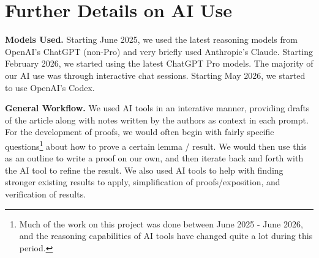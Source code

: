\documentclass[11pt,reqno]{amsproc}
\numberwithin{equation}{section}
\theoremstyle{definition}
\theoremstyle{plain}
\begin{document}
\section{Further Details on AI Use} \label{apxsec:ai_use}

\textbf{Models Used.} Starting June 2025, we used the latest  reasoning models from OpenAI's ChatGPT (non-Pro) and very briefly used Anthropic's Claude. Starting February 2026, we started using the latest ChatGPT Pro models. The majority of our AI use was through interactive chat sessions. Starting May 2026, we started to use OpenAI's Codex. \medskip

\textbf{General Workflow.} We  used AI tools in an interative manner, providing drafts of the article along with notes written by the authors as context in each prompt. For the development of proofs, we would often begin with fairly specific questions\footnote{Much of the work on this project was done between June 2025 - June 2026, and the reasoning capabilities of AI tools have changed quite a lot during this period.} about how to prove a certain lemma / result. We would then use this as an outline to write a proof on our own, and then iterate back and forth with the AI tool to refine the result. We also used AI tools to help with finding stronger existing results to apply, simplification of proofs/exposition, and verification of results. \medskip
\end{document}
